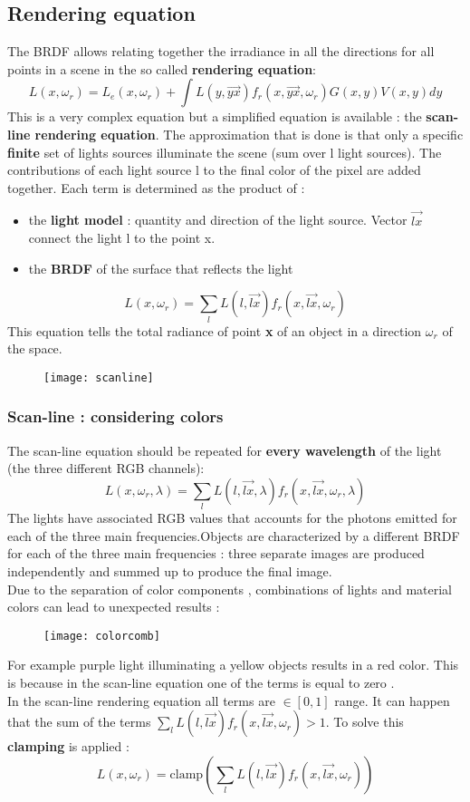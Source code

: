 \subsection{Rendering equation}
The BRDF allows relating together the irradiance in all the directions for all points in a scene in the so called \textbf{rendering equation}:
$$ L(x,\omega_r)= L_e(x,\omega_r)+ \int {L(y,\vec{yx})f_r(x,\vec{yx},\omega_r)G(x,y)V(x,y)dy}$$
This is a very complex equation but a simplified equation is available  : the \textbf{scan-line rendering equation}. The approximation that is done is that only a specific \textbf{finite} set of lights sources illuminate the scene (sum over l light sources). The contributions of each light source l to the final color of the pixel are added together. Each term is determined as the product of :
\begin{itemize}
\item the \textbf{light model} : quantity and direction of the light source. Vector $\vec{lx}$ connect the light l to the point x.
\item the \textbf{BRDF} of the surface that reflects the light
\end{itemize}
\[
\boxed{L(x,\omega_r) = \sum\limits_{l}L(l,\vec{lx})f_r(x,\vec{lx},\omega_r)}
\]
This equation tells the total radiance of point \textbf{x} of an object in a direction $\omega_r$ of the space.
\begin{figure}[H]
  \centering
  \texttt{[image: scanline]}
\end{figure}

\subsubsection{Scan-line : considering colors}
The scan-line equation should be repeated for \textbf{every wavelength} of the light (the three different RGB channels): $$ L(x,\omega_r,\lambda) = \sum\limits_{l}L(l,\vec{lx},\lambda)f_r(x,\vec{lx},\omega_r,\lambda)$$
The lights have associated RGB values that accounts for the photons emitted for each of the three main frequencies.Objects are characterized by a different BRDF for each of the three main frequencies : three separate images are produced independently and summed up to produce the final image.\\
Due to the separation of color components , combinations of lights and material colors can lead to unexpected results :
\begin{figure}[H]
  \centering
  \texttt{[image: colorcomb]}
\end{figure}
For example purple light illuminating a yellow objects results in a red color. This is because in the scan-line equation one of the terms is equal to zero .\\
In the scan-line rendering equation all terms are $\in [0,1]$ range. It can happen that the sum of the terms $\sum\limits_{l}L(l,\vec{lx})f_r(x,\vec{lx},\omega_r) >1$. To solve this \textbf{clamping} is applied :
\[
\boxed{L(x,\omega_r)= \text{clamp} \left( \sum\limits_{l}L(l,\vec{lx})f_r(x,\vec{lx},\omega_r) \right) }
\]


